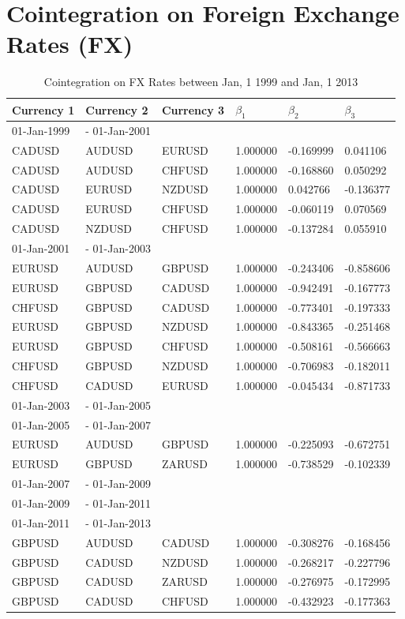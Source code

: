 \documentclass[11pt,a4,twosided,singlespacing,titlepagenumber=on]{scrreprt}
\numberwithin{equation}{chapter} %
\theoremstyle{remark}
\begin{document}
\section{Cointegration on Foreign Exchange Rates (FX)}

\begin{table}[H]
\centering
\begin{tabular}{llllll}
Currency 1      & Currency 2 & Currency 3 & $\beta_1$ & $\beta_2$ & $\beta_3$ \\ 
\hline
01-Jan-1999 &- 01-Jan-2001 \\
\hline
CADUSD & AUDUSD & EURUSD & 1.000000& -0.169999& 0.041106 \\
CADUSD & AUDUSD & CHFUSD & 1.000000& -0.168860& 0.050292 \\
CADUSD & EURUSD & NZDUSD & 1.000000& 0.042766& -0.136377 \\
CADUSD & EURUSD & CHFUSD & 1.000000& -0.060119& 0.070569 \\
CADUSD & NZDUSD & CHFUSD & 1.000000& -0.137284& 0.055910 \\
\hline
01-Jan-2001 &- 01-Jan-2003 \\
\hline
EURUSD & AUDUSD & GBPUSD & 1.000000& -0.243406& -0.858606 \\
EURUSD & GBPUSD & CADUSD & 1.000000& -0.942491& -0.167773 \\
CHFUSD & GBPUSD & CADUSD & 1.000000& -0.773401& -0.197333 \\
EURUSD & GBPUSD & NZDUSD & 1.000000& -0.843365& -0.251468 \\
EURUSD & GBPUSD & CHFUSD & 1.000000& -0.508161& -0.566663 \\
CHFUSD & GBPUSD & NZDUSD & 1.000000& -0.706983& -0.182011 \\
CHFUSD & CADUSD & EURUSD & 1.000000& -0.045434& -0.871733 \\
\hline
01-Jan-2003 &- 01-Jan-2005 \\
\hline
01-Jan-2005 &- 01-Jan-2007 \\
\hline
EURUSD & AUDUSD & GBPUSD & 1.000000& -0.225093& -0.672751 \\
EURUSD & GBPUSD & ZARUSD & 1.000000& -0.738529& -0.102339 \\
\hline
01-Jan-2007 &- 01-Jan-2009 \\
\hline
01-Jan-2009 &- 01-Jan-2011 \\
\hline
01-Jan-2011 &- 01-Jan-2013 \\
\hline
GBPUSD & AUDUSD & CADUSD & 1.000000& -0.308276& -0.168456 \\
GBPUSD & CADUSD & NZDUSD & 1.000000& -0.268217& -0.227796 \\
GBPUSD & CADUSD & ZARUSD & 1.000000& -0.276975& -0.172995 \\
GBPUSD & CADUSD & CHFUSD & 1.000000& -0.432923& -0.177363 \\
\hline
\end{tabular}
\caption{Cointegration on FX Rates between Jan, 1 1999 and Jan, 1 2013}
\label{coint_fx}
\end{table}
\end{document}
